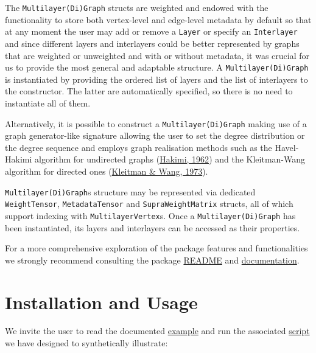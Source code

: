 \documentclass[
]{article}
\begin{document}
The \texttt{Multilayer(Di)Graph} structs are weighted and endowed with
the functionality to store both vertex-level and edge-level metadata by
default so that at any moment the user may add or remove a
\texttt{Layer} or specify an \texttt{Interlayer} and since different
layers and interlayers could be better represented by graphs that are
weighted or unweighted and with or without metadata, it was crucial for
us to provide the most general and adaptable structure. A
\texttt{Multilayer(Di)Graph} is instantiated by providing the ordered
list of layers and the list of interlayers to the constructor. The
latter are automatically specified, so there is no need to instantiate
all of them.

Alternatively, it is possible to construct a
\texttt{Multilayer(Di)Graph} making use of a graph generator-like
signature allowing the user to set the degree distribution or the degree
sequence and employs graph realisation methods such as the Havel-Hakimi
algorithm for undirected graphs
(\protect\hyperlink{ref-Hakimi1962}{Hakimi, 1962}) and the Kleitman-Wang
algorithm for directed ones
(\protect\hyperlink{ref-Kleitman1973}{Kleitman \& Wang, 1973}).

\texttt{Multilayer(Di)Graph}s structure may be represented via dedicated
\texttt{WeightTensor}, \texttt{MetadataTensor} and
\texttt{SupraWeightMatrix} structs, all of which support indexing with
\texttt{MultilayerVertex}s. Once a \texttt{Multilayer(Di)Graph} has been
instantiated, its layers and interlayers can be accessed as their
properties.

For a more comprehensive exploration of the package features and
functionalities we strongly recommend consulting the package
\href{https://github.com/JuliaGraphs/MultilayerGraphs.jl/blob/main/README.md}{README}
and \href{https://juliagraphs.org/MultilayerGraphs.jl}{documentation}.

\hypertarget{installation-and-usage}{%
\section{Installation and Usage}\label{installation-and-usage}}

We invite the user to read the documented
\href{https://github.com/JuliaGraphs/MultilayerGraphs.jl/tree/main/example/example.md}{example}
and run the associated
\href{https://github.com/JuliaGraphs/MultilayerGraphs.jl/blob/main/example/example.jl}{script}
we have designed to synthetically illustrate:
\end{document}
